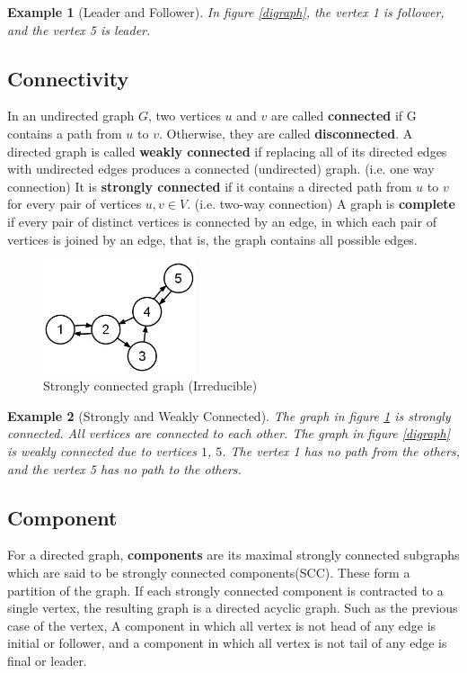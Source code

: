 \documentclass[11pt, a4paper, oneside, openany, reqno]{book}
\newtheorem{example}{Example}
\theoremstyle{definition}
\theoremstyle{remark}
\numberwithin{equation}{chapter} %
\begin{document}
\begin{example}[Leader and Follower]
	In figure \ref{digraph}, the vertex 1 is follower, 
	and the vertex 5 is leader.
\end{example}


\subsection{Connectivity}
In an undirected graph $ G $, two vertices $ u $ and $ v $ are called \textbf{connected} 
if G contains a path from $u$ to $v$. 
Otherwise, they are called \textbf{disconnected}.
A directed graph is called \textbf{weakly connected} 
if replacing all of its directed edges with undirected edges 
produces a connected (undirected) graph. (i.e. one way connection)
It is \textbf{strongly connected} if it contains a directed path from $ u $ to $v$ 
for every pair of vertices $u,v \in V$. (i.e. two-way connection)
A graph is \textbf{complete} if every pair of distinct vertices is connected by an edge,
in which each pair of vertices is joined by an edge, 
that is, the graph contains all possible edges.

\begin{figure}[htp]
	\centering
	\includegraphics[width=0.40\textwidth]{graph2.png}
	\caption{Strongly connected graph (Irreducible)}\label{stronggraph}
\end{figure}

\begin{example}[Strongly and Weakly Connected]
	The graph in figure \ref{stronggraph} is strongly connected. 
	All vertices are connected to each other.
	The graph in figure \ref{digraph} is weakly connected due to vertices $ 1 $, $ 5 $. 
	The vertex 1 has no path from the others, and the vertex 5 has no path to the others.
\end{example}

\subsection{Component}
For a directed graph, \textbf{components} are its maximal strongly connected subgraphs 
which are said to be strongly connected components(SCC). These form a partition of the graph.
If each strongly connected component is contracted to a single vertex, 
the resulting graph is a directed acyclic graph.
Such as the previous case of the vertex, 
A component in which all vertex is not head of any edge is initial or follower,
and a component in which all vertex is not tail of any edge is final or leader.
\end{document}

